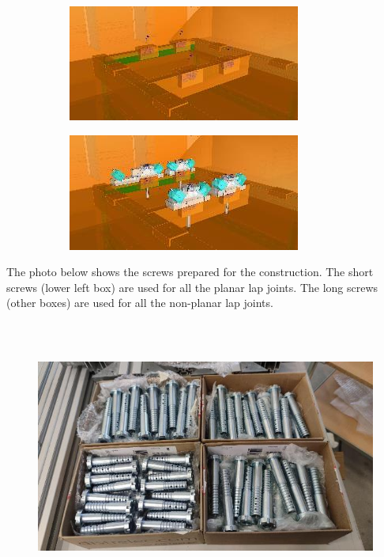 \documentclass[11pt]{book}
\begin{document}
\begin{figure}[H]
\centering
\begin{subfigure}[b]{0.45\textwidth}
\centering
\includegraphics[width=\textwidth]{./images/image35.jpeg}
\end{subfigure}
\hfill
\begin{subfigure}[b]{0.45\textwidth}
\centering
\includegraphics[width=\textwidth]{./images/image36.jpeg}
\end{subfigure}
\end{figure}


The photo below shows the screws prepared for the construction. The short screws (lower left box) are used for all the planar lap joints. The long screws (other boxes) are used for all the non-planar lap joints.

\begin{figure}[H]
\includegraphics[width=15.92cm,height=8.96cm]{./images/image37.jpeg}
\end{figure}
\end{document}
